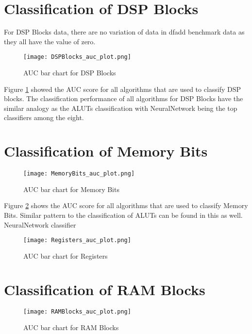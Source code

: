 \section{Classification of DSP Blocks}

For DSP Blocks data, there are no variation of data in dfadd benchmark data as they all have the value of zero.

\begin{figure}[h!]
\centering
\texttt{[image: DSPBlocks\_auc\_plot.png]}
\caption{AUC bar chart for DSP Blocks}
\label{figure:dsp_auc_plot}
\end{figure}

Figure \ref{figure:dsp_auc_plot} showed the AUC score for all algorithms that are used to classify DSP blocks. The classification performance of all algorithms for DSP Blocks have the similar analogy as the ALUTs classification with NeuralNetwork being the top classifiers among the eight.

\section{Classification of Memory Bits}
\begin{figure}[h!]
\centering
\texttt{[image: MemoryBits\_auc\_plot.png]}
\caption{AUC bar chart for Memory Bits}
\label{figure:MemoryBits_auc_plot}
\end{figure}

Figure \ref{figure:MemoryBits_auc_plot} shows the AUC score for all algorithms that are used to classify Memory Bits. Similar pattern to the classification of ALUTs can be found in this as well. NeuralNetwork classifier

\begin{figure}[h!]
\centering
\texttt{[image: Registers\_auc\_plot.png]}
\caption{AUC bar chart for Registers}
\label{figure:Registers_auc_plot}
\end{figure}

\section{Classification of RAM Blocks}

\begin{figure}[h!]
\centering
\texttt{[image: RAMBlocks\_auc\_plot.png]}
\caption{AUC bar chart for RAM Blocks}
\label{figure:RAMBlocks_auc_plot}
\end{figure}

